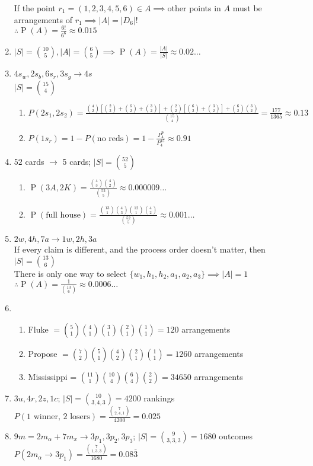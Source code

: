 \documentclass{article}
\newcommand{\set}[1]{\{#1\}}
\newcommand{\pr}[1]{\operatorname{P}(#1)}
\begin{document}
\begin{enumerate}
  If the point $r_1 = (1,2,3,4,5,6) \in A \implies$other points in $A$ must be arrangements of $r_1 \implies |A| = |D_6|!$\\
  $\therefore \pr{A} = \frac{6!}{6^6} \approx 0.015$
  \item $|S| = \binom{10}{5}, |A| = \binom{6}{5} \implies \pr{A} = \frac{|A|}{|S|} \approx 0.02\ldots$
  \item $4s_w, 2s_b, 6s_r, 3s_g \to 4s$\\
  $|S| = \binom{15}{4}$
  \begin{enumerate}
    \item $P(2s_1, 2s_2) = \frac{
      \binom{4}{2}[\binom{2}{2} + \binom{6}{2} + \binom{3}{2}] +
      \binom{2}{2}[\binom{6}{2} + \binom{3}{2}] +
      \binom{6}{2}\binom{3}{2}}
      {\binom{15}{4}} = \frac{177}{1365} \approx 0.13$
    \item $P(1s_r) = 1 - P(\text{no reds}) = 1 - \frac{P_4^{9}}{P_4^{15}} \approx 0.91$
  \end{enumerate}
  \item $52$ cards $\to$ 5 cards; $|S| = \binom{52}{5}$ \begin{enumerate}
    \item $\pr{3A, 2K} = \frac{\binom{4}{3}\binom{4}{2}}{\binom{52}{5}} \approx 0.000009\ldots$
    \item $\pr{\text{full house}} = \frac{\binom{13}{1}\binom{4}{3}\binom{12}{1}\binom{4}{2}}{\binom{52}{5}} \approx 0.001\ldots$ 
  \end{enumerate}
  \item $2w, 4h, 7a \to 1w, 2h, 3a$\\
  If every claim is different, and the process order doesn't matter, then $|S| = \binom{13}{6}$\\
  There is only one way to select $\set{w_1, h_1, h_2, a_1, a_2, a_3} \implies |A| = 1$\\
  $\therefore \pr{A} = \frac{1}{\binom{13}{6}} \approx 0.0006\ldots$
  \item \begin{enumerate}
    \item Fluke $=\binom{5}{1}\binom{4}{1}\binom{3}{1}\binom{2}{1}\binom{1}{1} = 120$ arrangements
    \item Propose $= \binom{7}{2}\binom{5}{1}\binom{4}{2}\binom{2}{1}\binom{1}{1} = 1260$ arrangements
    \item Mississippi = $\binom{11}{1}\binom{10}{4}\binom{6}{4}\binom{2}{2} = 34650$ arrangements
  \end{enumerate}
  \item $3u, 4r, 2z, 1c$; $|S| = \binom{10}{3,4,3} = 4200$ rankings\\
  $P(\text{1 winner, 2 losers}) = \frac{\binom{7}{2,4,1}}{4200} = 0.025$
  \item $9m = 2m_\alpha + 7m_x \to 3p_1, 3p_2, 3p_3$; $|S| = \binom{9}{3,3,3} = 1680$ outcomes\\
  $P(2m_\alpha \to 3p_1) = \frac{\binom{7}{1,3,3}}{1680} = 0.08\overline{3}$
  

\end{enumerate}
\end{document}
